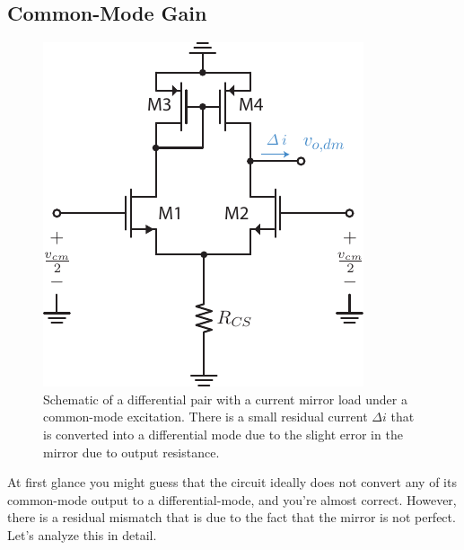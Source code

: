 \subsection{Common-Mode Gain}
\begin{figure}[tb]
\begin{center}
\includegraphics[scale=1]{Diffpair_se_cmgain.pdf}
\end{center}
\caption{Schematic of a differential pair with a current mirror load under a common-mode excitation.  There is a small residual current $\Delta i$ that is converted into a differential mode due to the slight error in the mirror due to output resistance.}
\label{fig:Diffpair_se_cmgain.pdf}
\end{figure}

At first glance you might guess that the circuit ideally does not convert any of its common-mode output to a differential-mode, and you're almost correct.  However, there is a residual mismatch that is due to the fact that the mirror is not perfect.  Let's analyze this in detail.

